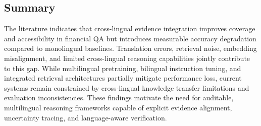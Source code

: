 \subsection{Summary}

The literature indicates that cross-lingual evidence integration improves coverage and accessibility in financial QA but introduces measurable accuracy degradation compared to monolingual baselines. Translation errors, retrieval noise, embedding misalignment, and limited cross-lingual reasoning capabilities jointly contribute to this gap. While multilingual pretraining, bilingual instruction tuning, and integrated retrieval architectures partially mitigate performance loss, current systems remain constrained by cross-lingual knowledge transfer limitations and evaluation inconsistencies. These findings motivate the need for auditable, multilingual reasoning frameworks capable of explicit evidence alignment, uncertainty tracing, and language-aware verification.
